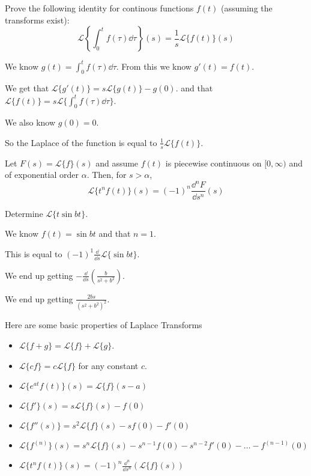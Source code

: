 \documentclass[../diffeq.tex]{subfiles}
\begin{document}
\begin{example}
    Prove the following identity for continous functions $f(t)$ (assuming the transforms exist):
    \[ \mathcal{L}\left\{\int_0^t f(\tau)\dd \tau\right\}(s)=\frac{1}{s}\mathcal{L}\{f(t)\}(s) \]

    We know $g(t)=\int_0^t f(\tau)\dd \tau$. From this we know $g'(t)=f(t)$.

    We get that $\mathcal{L}\{g'(t)\}=s\mathcal{L}\{g(t)\}-g(0)$. and that $\mathcal{L}\{f(t)\}=s\mathcal{L}\{\int_0^t f(\tau)\dd \tau\}$.

    We also know $g(0)=0$.

    So the Laplace of the function is equal to $\frac{1}{s}\mathcal{L}\{f(t)\}$.
\end{example}

\begin{theorem}
    Let $F(s)=\mathcal{L}\{f\}(s)$ and assume $f(t)$ is piecewise continuous on $[0,\infty)$ and of exponential order $\alpha$. Then, for $s>\alpha$,
    \[ \mathcal{L}\{t^nf(t)\}(s)=(-1)^n \frac{\dd^n F}{\dd s^n}(s) \]
\end{theorem}

\begin{example}
    Determine $\mathcal{L}\{t\sin bt\}$.

    We know $f(t)=\sin bt$ and that $n=1$.

    This is equal to $(-1)^1\frac{\dd}{\dd s}\mathcal{L}\{\sin bt\}$.

    We end up getting $-\frac{\dd}{\dd s}\left(\frac{b}{s^2+b^2}\right)$.

    We end up getting $\frac{2bs}{(s^2+b^2)^2}$.
\end{example}

Here are some basic properties of Laplace Transforms
\begin{itemize}
    \item $\mathcal{L}\{f+g\}=\mathcal{L}\{f\}+\mathcal{L}\{g\}$.
    \item $\mathcal{L}\{cf\}=c\mathcal{L}\{f\}$ for any constant $c$.
    \item $\mathcal{L}\{e^{at}f(t)\}(s)=\mathcal{L}\{f\}(s-a)$
    \item $\mathcal{L}\{f'\}(s)=s\mathcal{L}\{f\}(s)-f(0)$
    \item $\mathcal{L}\{f''(s)\}=s^2\mathcal{L}\{f\}(s)-sf(0)-f'(0)$
    \item $\mathcal{L}\{f^{(n)}\}(s)=s^n\mathcal{L}\{f\}(s)-s^{n-1}f(0)-s^{n-2}f'(0)-\dots-f^{(n-1)}(0)$
    \item $\mathcal{L}\{t^nf(t)\}(s)=(-1)^n \frac{\dd^n}{\dd s^n}(\mathcal{L}\{f\}(s))$
\end{itemize}
\end{document}
